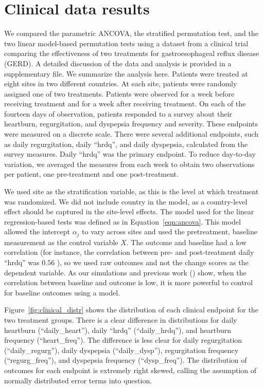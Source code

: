 \documentclass[12pt]{article}
\newcommand{\todo}[1]{{\color{red}{TO DO: \sc #1}}}
\begin{document}
\section{Clinical data results}\label{sec:results}
We compared the parametric ANCOVA, the stratified permutation test, and the two linear model-based permutation tests using a dataset from a clinical trial comparing the effectiveness of two treatments for gastroesophageal reflux disease (GERD).
A detailed discussion of the data and analysis is provided in a supplementary file.
We summarize the analysis here.
Patients were treated at eight sites in two different countries.
At each site, patients were randomly assigned one of two treatments.
Patients were observed for a week before receiving treatment and for a week after receiving treatment.
On each of the fourteen days of observation, patients responded to a survey about their heartburn, regurgitation, and dyspepsia frequency and severity.
These endpoints were measured on a discrete scale.
There were several additional endpoints, such as daily regurgitation, daily ``hrdq'', and daily dyspepsia, calculated from the survey measures.
Daily ``hrdq'' was the primary endpoint.
To reduce day-to-day variation, we averaged the measures from each week to obtain two observations per patient, one pre-treatment and one post-treatment.

We used site as the stratification variable, as this is the level at which treatment was randomized.
We did not include country in the model, as a country-level effect should be captured in the site-level effects.
The model used for the linear regression-based tests was defined as in Equation~\ref{eqn:ancova}.
This model allowed the intercept $\alpha_j$ to vary across sites and used the pretreatment, baseline measurement as the control variable $X$.
The outcome and baseline had a low correlation (for instance, the correlation between pre- and post-treatment daily ``hrdq'' was $0.56$ \todo{were other outcomes even lower? the cutoff for correlation was 0.5}), so we used raw outcomes and not the change scores as the dependent variable. 
As our simulations and previous work (\cite{frison_repeated_1992}) show, when the correlation between baseline and outcome is low, it is more powerful to control for baseline outcomes using a model.

Figure~\ref{fig:clinical_distr} shows the distribution of each clinical endpoint for the two treatment groups.
There is a clear difference in distributions for daily heartburn (``daily\_heart''), daily ``hrdq'' (``daily\_hrdq''), and heartburn frequency (``heart\_freq'').
The difference is less clear for daily regurgitation (``daily\_regurg''), daily dyspepsia (``daily\_dysp''), regurgitation frequency (``regurg\_freq''), and dyspepsia frequency (``dysp\_freq'').
The distribution of outcomes for each endpoint is extremely right skewed, calling the assumption of normally distributed error terms into question.
\end{document}
